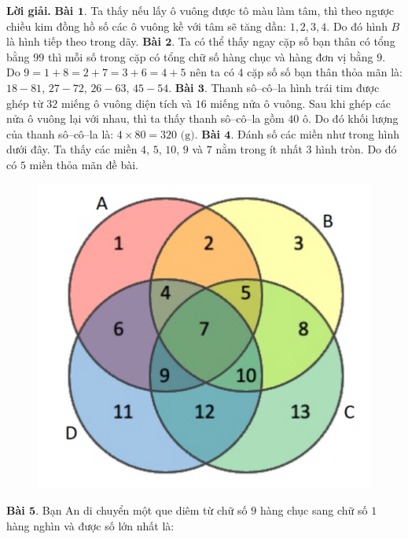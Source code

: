	\begin{multicols}{2}
	\textbf{\color{toancuabi}Lời giải.}
	\vskip 0.1cm
	\textbf{\color{toancuabi}Bài $\pmb{1.}$} Ta thấy nếu lấy ô vuông được tô màu làm tâm, thì theo ngược chiều kim đồng hồ số các ô vuông kề với tâm sẽ tăng dần: $1,2,3,4$. Do đó hình $B$ là hình tiếp theo trong dãy.
	\vskip 0.1cm
	\textbf{\color{toancuabi}Bài $\pmb{2.}$} Ta có thể thấy ngay cặp số bạn thân có tổng bằng $99$ thì mỗi số trong cặp có tổng chữ số hàng chục và hàng đơn vị bằng $9$. Do $9 = 1+8 = 2+7 = 3+6 = 4+5$ nên ta có $4$ cặp số số bạn thân thỏa mãn là: $18-81$, $27-72$, $26-63$, $45-54$.
	\vskip 0.1cm
	\textbf{\color{toancuabi}Bài $\pmb{3.}$} Thanh sô--cô--la hình trái tim được ghép từ $32$ miếng ô vuông diện tích và $16$ miếng nửa ô vuông. Sau khi ghép các nửa ô vuông lại với nhau, thì ta thấy thanh sô--cô--la gồm $40$ ô. Do đó khối lượng của thanh sô--cô--la là: $4\times 80=320 \text{ (g)}$.
	\vskip 0.1cm
	\textbf{\color{toancuabi}Bài $\pmb{4.}$} Đánh số các miền như trong hình dưới đây. Ta thấy các miền $4$, $5$, $10$, $9$ và $7$ nằm trong ít nhất $3$ hình tròn. Do đó có $5$ miền thỏa mãn đề bài.
	\begin{figure}[H]
		\vspace*{-5pt}
		\centering
		\captionsetup{labelformat= empty, justification=centering}
		\includegraphics[width= 0.7\linewidth]{7}
		\vspace*{-10pt}
	\end{figure}
	\textbf{\color{toancuabi}Bài $\pmb{5.}$} Bạn An di chuyển một que diêm từ chữ số $9$ hàng chục sang chữ số $1$ hàng nghìn và được số lớn nhất là:  
	\begin{figure}[H]
		\vspace*{-5pt}
		\centering

\end{figure}
\end{multicols}
